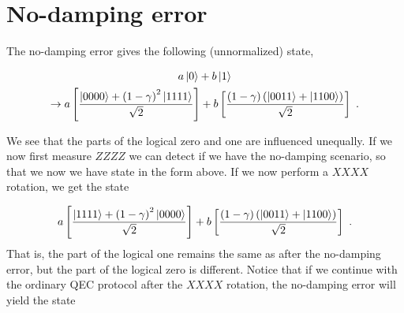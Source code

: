 \documentclass[twoside]{article}
\begin{document}
\section*{No-damping error}
The no-damping error gives the following (unnormalized) state,

\begin{gather}
a\Ket{0}+b\Ket{1}\\
\rightarrow a\left[ \frac{\Ket{0000}+\left(1-\gamma\right)^2\Ket{1111}}{\sqrt{2}}\right] + b\left[ \frac{\left(1-\gamma\right)\left(\Ket{0011}+\Ket{1100}\right)}{\sqrt{2}}\right]\ .
\end{gather}

We see that the parts of the logical zero and one are influenced unequally. If we now first measure $ZZZZ$ we can detect if we have the no-damping scenario, so that we now we have state in the form above. If we now perform a $XXXX$ rotation, we get the state

\begin{align}
a\left[ \frac{\Ket{1111}+\left(1-\gamma\right)^2\Ket{0000}}{\sqrt{2}}\right] + b\left[ \frac{\left(1-\gamma\right)\left(\Ket{0011}+\Ket{1100}\right)}{\sqrt{2}}\right]\ .
\end{align}
That is, the part of the logical one remains the same as after the no-damping error, but the part of the logical zero is different. Notice that if we continue with the ordinary QEC protocol after the $XXXX$ rotation, the no-damping error will yield the state 
\end{document}
